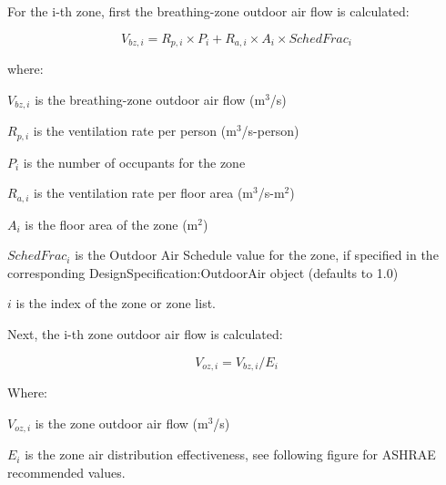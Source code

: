 For the i-th zone, first the breathing-zone outdoor air flow is calculated:

\begin{equation}
{V_{bz,i}} = {R_{p,i}} \times {P_i} + {R_{a,i}} \times {A_i} \times {SchedFrac_i}
\end{equation}

where:

\({V_{bz,i}}\) is the breathing-zone outdoor air flow (m\(^3\)/s)

\({R_{p,i}}\) is the ventilation rate per person (m\(^3\)/s-person)

\({P_i}\) is the number of occupants for the zone

\({R_{a,i}}\) is the ventilation rate per floor area (m\(^3\)/s-m\(^2\))

\({A_i}\) is the floor area of the zone (m\(^2\))

\({SchedFrac_i}\) is the Outdoor Air Schedule value for the zone, if specified in the corresponding DesignSpecification:OutdoorAir object (defaults to 1.0)

\(i\) is the index of the zone or zone list.

Next, the i-th zone outdoor air flow is calculated:

\begin{equation}
{V_{oz,i}} = {V_{bz,i}}/{E_i}
\end{equation}

Where:

\({V_{oz,i}}\) is the zone outdoor air flow (m\(^3\)/s)

\({E_i}\) is the zone air distribution effectiveness, see following figure for ASHRAE recommended values.

